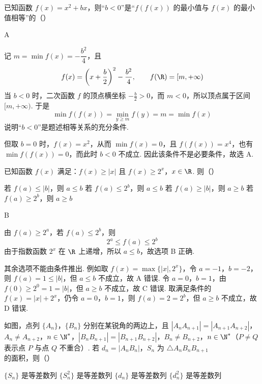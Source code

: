 \begin{problem}
已知函数 \(f(x)=x^2+bx\)，则“\(b<0\)”是“\(f(f(x))\) 的最小值与 \(f(x)\) 的最小值相等”的（\quad）

\choices
    {}
    {}
    {}
    {}
\end{problem}

\begin{answer}
A
\end{answer}

\begin{solution}
记 \(m=\min f(x)=-\dfrac{b^2}{4}\)，且
\[
f(x)=\left(x+\frac b2\right)^2-\frac{b^2}{4},\qquad f(\R)=[m,+\infty)
\]
当 \(b<0\) 时，二次函数 \(f\) 的顶点横坐标 \(-\frac{b}{2}>0\)，而 \(m<0\)，所以顶点属于区间 \([m,+\infty)\). 于是
\[
\min f(f(x))=\min_{y\geqslant m}f(y)=m=\min f(x)
\]
说明“\(b<0\)”是题述相等关系的充分条件.

但取 \(b=0\) 时，\(f(x)=x^2\)，从而 \(\min f(x)=0\)，且 \(f(f(x))=x^4\)，也有 \(\min f(f(x))=0\)，而此时 \(b<0\) 不成立. 因此该条件不是必要条件，故选 A.
\end{solution}

\begin{problem}
已知函数 \(f(x)\) 满足：\(f(x)\ge |x|\) 且 \(f(x)\ge 2^x\)，\(x\in\R\). 则（\quad）

\choices
    {若 \(f(a)\le |b|\)，则 \(a\le b\)}
    {若 \(f(a)\le 2^b\)，则 \(a\le b\)}
    {若 \(f(a)\ge |b|\)，则 \(a\ge b\)}
    {若 \(f(a)\ge 2^b\)，则 \(a\ge b\)}
\end{problem}

\begin{answer}
B
\end{answer}

\begin{solution}
由 \(f(a)\geqslant2^a\)，若 \(f(a)\leqslant2^b\)，则
\[
2^a\leqslant f(a)\leqslant2^b
\]
由于指数函数 \(2^x\) 在 \(\R\) 上递增，所以 \(a\leqslant b\)，故选项 B 正确.

其余选项不能由条件推出. 例如取 \(f(x)=\max\{|x|,2^x\}\)，令 \(a=-1\)，\(b=-2\)，则 \(f(a)=1\leqslant|b|\)，但 \(a\leqslant b\) 不成立，故 A 错误. 令 \(a=0\)，\(b=1\)，由 \(f(0)\geqslant2^0=1=|b|\)，但 \(a\geqslant b\) 不成立，故 C 错误. 取满足条件的 \(f(x)=|x|+2^x\)，仍令 \(a=0\)，\(b=1\)，则 \(f(a)=2=2^b\)，但 \(a\geqslant b\) 不成立，故 D 错误.
\end{solution}

\begin{problem}
如图，点列 \(\{A_n\}\)，\(\{B_n\}\) 分别在某锐角的两边上，且 \(|A_nA_{n+1}|=|A_{n+1}A_{n+2}|\)，\(A_n\ne A_{n+2}\)，\(n\in\N^*\)，\(|B_nB_{n+1}|=|B_{n+1}B_{n+2}|\)，\(B_n\ne B_{n+2}\)，\(n\in\N^*\)（\(P\ne Q\) 表示点 \(P\) 与点 \(Q\) 不重合）. 若 \(d_n=|A_nB_n|\)，\(S_n\) 为 \(\triangle A_nB_nB_{n+1}\) 的面积，则（\quad）


\choices
    {\(\{S_n\}\) 是等差数列}
    {\(\{S_n^2\}\) 是等差数列}
    {\(\{d_n\}\) 是等差数列}
    {\(\{d_n^2\}\) 是等差数列}
\end{problem}

